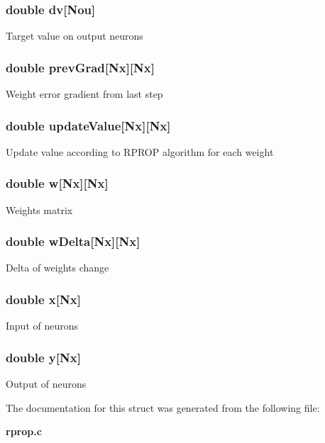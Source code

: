 \subsubsection[{dv}]{\setlength{\rightskip}{0pt plus 5cm}double dv[{\bf Nou}]}\label{structann__t_a3cd26d516c0d78e0bd8e83f7b5d96056}
Target value on output neurons 
\subsubsection[{prev\+Grad}]{\setlength{\rightskip}{0pt plus 5cm}double prev\+Grad[Nx][Nx]}\label{structann__t_ae668825bd99ec5a8e701cd34833d92c8}
Weight error gradient from last step 
\subsubsection[{update\+Value}]{\setlength{\rightskip}{0pt plus 5cm}double update\+Value[Nx][Nx]}\label{structann__t_a56f1cf095bad5da7e0c944dd9727293a}
Update value according to R\+P\+R\+O\+P algorithm for each weight 
\subsubsection[{w}]{\setlength{\rightskip}{0pt plus 5cm}double w[Nx][Nx]}\label{structann__t_aee905c93142ba709a90118c788622185}
Weights matrix 
\subsubsection[{w\+Delta}]{\setlength{\rightskip}{0pt plus 5cm}double w\+Delta[Nx][Nx]}\label{structann__t_a19e899724a3a7ab9150e22e0d48ebc3e}
Delta of weights change 
\subsubsection[{x}]{\setlength{\rightskip}{0pt plus 5cm}double x[Nx]}\label{structann__t_ac566dbcdd25e058c1e82f59d63dfd12b}
Input of neurons 
\subsubsection[{y}]{\setlength{\rightskip}{0pt plus 5cm}double y[Nx]}\label{structann__t_adec9cbbd838a286742a4ae286bff0e30}
Output of neurons 

The documentation for this struct was generated from the following file\+:\begin{DoxyCompactItemize}
\item 
{\bf rprop.\+c}\end{DoxyCompactItemize}
